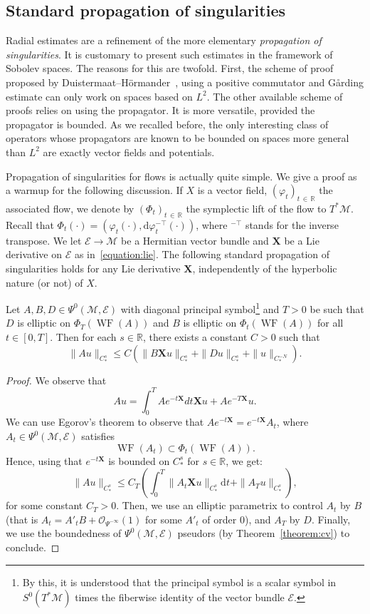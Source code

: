 \documentclass[10pt]{amsart}
\theoremstyle{definition}\newtheorem{defi}[theo]{Definition}\newtheorem{rema}[theo]{Remark}\newtheorem{exam}[theo]{Example}\newtheorem{exem}[theo]{Example}\newtheorem{nota}[theo]{Notation}
\newcommand{\R}{\mathbb{R}}
\newcommand{\X}{\mathbf{X}}
\newcommand{\mc}{\mathcal}
\newcommand{\M}{\mathcal{M}}
\newcommand{\E}{\mathcal{E}}
\newcommand{\dd}{\mathrm{d}}
\DeclareMathOperator{\WF}{WF}
\begin{document}
\subsection{Standard propagation of singularities}

Radial estimates are a refinement of the more elementary \emph{propagation of singularities}. It is customary to present such estimates in the framework of Sobolev spaces. The reasons for this are twofold. First, the scheme of proof proposed by Duistermaat--H\"ormander~\cite{Duistermaat-Hormander-72}, using a positive commutator and G{\r a}rding estimate can only work on spaces based on $L^2$. The other available scheme of proofs relies on using the propagator. It is more versatile, provided the propagator is bounded. As we recalled before, the only interesting class of operators whose propagators are known to be bounded on spaces more general than $L^2$ are exactly vector fields and potentials.

Propagation of singularities for flows is actually quite simple. We give a proof as a warmup for the following discussion. If $X$ is a vector field, $(\varphi_t)_{t\,\in\,\R}$ the associated flow, we denote by $(\Phi_t)_{t\,\in\,\R}$ the symplectic lift of the flow to $T^\ast \M$. Recall that $\Phi_t(\cdot) = (\varphi_t(\cdot), \dd \varphi_t^{-\top}(\cdot))$, where ${}^{-\top}$ stands for the inverse transpose. We let $\E \rightarrow \M$ be a Hermitian vector bundle and $\X$ be a Lie derivative on $\E$ as in~\eqref{equation:lie}. The following standard propagation of singularities holds for any Lie derivative $\X$, independently of the hyperbolic nature (or not) of $X$.

\begin{prop}\label{prop:usual-propagation-Cs}
Let $A,B,D\in \Psi^0(\M,\E)$ with diagonal principal symbol\footnote{By this, it is understood that the principal symbol is a scalar symbol in $S^0(T^*\M)$ times the fiberwise identity of the vector bundle $\E$.} and $T>0$ be such that $D$ is elliptic on $\Phi_T(\WF(A))$ and $B$ is elliptic on $\Phi_t (\WF(A))$ for all $t\in [0,T]$. Then for each $s\in \R$, there exists a constant $C>0$ such that
\[
\| A u \|_{C_*^s} \leq C \left(\| B \X u \|_{C_*^s} + \| D u \|_{C_*^s} + \|u\|_{C_*^{-N}}\right).
\]
\end{prop}

\begin{proof}
We observe that
\[
A u = \int_0^T A e^{-t\X}dt \X u + A e^{-T\X}u.
\]
We can use Egorov's theorem to observe that $A e^{-t\X} = e^{-t\X} A_t$, where $A_t\in \Psi^0(\M,\E)$ satisfies
\[
\WF(A_t)\subset \Phi_t (\WF(A)).
\]
Hence, using that $e^{-t\X}$ is bounded on $C^s_\ast$ for $s\in\R$, we get:
\[
\|Au\|_{C^s_*} \leq C_T \left(\int_0^T \|A_t \X u\|_{C^s_*} \dd t + \|A_T u\|_{C^s_*}\right),
\]
for some constant $C_T > 0$. Then, we use an elliptic parametrix to control $A_t$ by $B$ (that is $A_t = A'_t B + \mc{O}_{\Psi^{-\infty}}(1)$ for some $A'_t$ of order $0$), and $A_T$ by $D$. Finally, we use the boundedness of $\Psi^0(\M,\E)$ pseudors (by Theorem~\ref{theorem:cv}) to conclude.
\end{proof}
\end{document}
